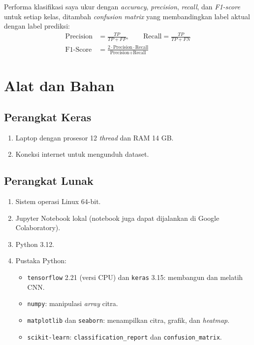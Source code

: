 \documentclass[a4paper,oneside,12pt]{report}
\begin{document}
Performa klasifikasi saya ukur dengan \textit{accuracy}, \textit{precision}, \textit{recall}, dan \textit{F1-score} untuk setiap kelas, ditambah \textit{confusion matrix} yang membandingkan label aktual dengan label prediksi:
\begin{align}
	\text{Precision} & = \frac{TP}{TP + FP}, \qquad \text{Recall} = \frac{TP}{TP + FN} \\
	\text{F1-Score}  & = \frac{2 \cdot \text{Precision} \cdot \text{Recall}}{\text{Precision} + \text{Recall}}
\end{align}

\clearpage

\chapter{Alat dan Bahan}

\section{Perangkat Keras}
\begin{enumerate}[noitemsep, topsep=2pt, parsep=1pt]
	\item Laptop dengan prosesor 12 \textit{thread} dan RAM 14 GB.
	\item Koneksi internet untuk mengunduh dataset.
\end{enumerate}

\section{Perangkat Lunak}
\begin{enumerate}[noitemsep, topsep=2pt, parsep=1pt]
	\item Sistem operasi Linux 64-bit.
	\item Jupyter Notebook lokal (notebook juga dapat dijalankan di Google Colaboratory).
	\item Python 3.12.
	\item Pustaka Python:
	      \begin{itemize}[noitemsep, topsep=1pt, parsep=0.5pt]
		      \item \texttt{tensorflow} 2.21 (versi CPU) dan \texttt{keras} 3.15: membangun dan melatih CNN.
		      \item \texttt{numpy}: manipulasi \textit{array} citra.
		      \item \texttt{matplotlib} dan \texttt{seaborn}: menampilkan citra, grafik, dan \textit{heatmap}.
		      \item \texttt{scikit-learn}: \texttt{classification\_report} dan \texttt{confusion\_matrix}.
	      \end{itemize}
\end{enumerate}
\end{document}
